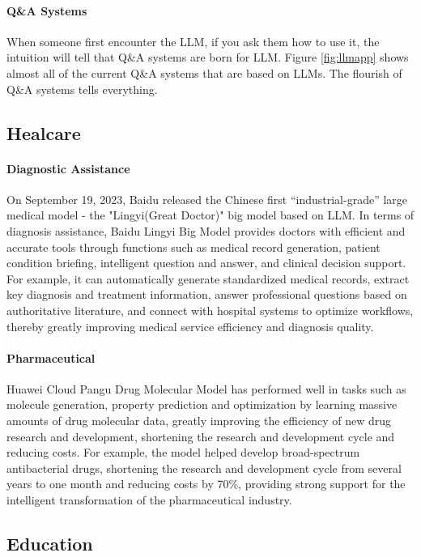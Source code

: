 \documentclass[fleqn,10pt]{SelfArx} %
\begin{document}
\paragraph{Q\&A Systems} When someone first encounter the LLM, if you ask them how to use it, the intuition will tell that Q\&A systems are born for LLM. Figure \ref{fig:llmapp} shows almost all of the current Q\&A systems that are based on LLMs. The flourish of Q\&A systems tells everything.

\subsection{Healcare}

\paragraph{Diagnostic Assistance} On September 19, 2023, Baidu released the Chinese first “industrial-grade” large medical model - the "Lingyi(Great Doctor)" big model based on LLM. In terms of diagnosis assistance, Baidu Lingyi Big Model provides doctors with efficient and accurate tools through functions such as medical record generation, patient condition briefing, intelligent question and answer, and clinical decision support. For example, it can automatically generate standardized medical records, extract key diagnosis and treatment information, answer professional questions based on authoritative literature, and connect with hospital systems to optimize workflows, thereby greatly improving medical service efficiency and diagnosis quality.

\paragraph{Pharmaceutical} Huawei Cloud Pangu Drug Molecular Model has performed well in tasks such as molecule generation, property prediction and optimization by learning massive amounts of drug molecular data, greatly improving the efficiency of new drug research and development, shortening the research and development cycle and reducing costs. For example, the model helped develop broad-spectrum antibacterial drugs, shortening the research and development cycle from several years to one month and reducing costs by 70\%, providing strong support for the intelligent transformation of the pharmaceutical industry.




\subsection{Education}
\end{document}
